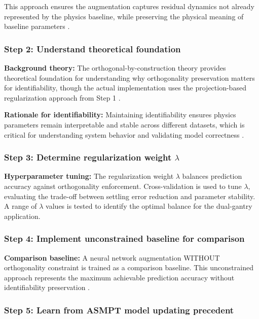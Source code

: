 This approach ensures the augmentation captures residual dynamics not already represented by the physics baseline, while preserving the physical meaning of baseline parameters \citep{gyorok2025projection, kon2022orthogonal}.

\subsubsection{Step 2: Understand theoretical foundation}

\textbf{Background theory:}
The orthogonal-by-construction theory provides theoretical foundation for understanding why orthogonality preservation matters for identifiability, though the actual implementation uses the projection-based regularization approach from Step 1 \citep{gyorok2025orthogonal}.

\textbf{Rationale for identifiability:}
Maintaining identifiability ensures physics parameters remain interpretable and stable across different datasets, which is critical for understanding system behavior and validating model correctness \citep{schoukens2019nonlinear}.

\subsubsection{Step 3: Determine regularization weight $\lambda$}

\textbf{Hyperparameter tuning:}
The regularization weight $\lambda$ balances prediction accuracy against orthogonality enforcement. Cross-validation is used to tune $\lambda$, evaluating the trade-off between settling error reduction and parameter stability. A range of $\lambda$ values is tested to identify the optimal balance for the dual-gantry application.

\subsubsection{Step 4: Implement unconstrained baseline for comparison}

\textbf{Comparison baseline:}
A neural network augmentation WITHOUT orthogonality constraint is trained as a comparison baseline. This unconstrained approach represents the maximum achievable prediction accuracy without identifiability preservation \citep{bolderman2024physics}.

\subsubsection{Step 5: Learn from ASMPT model updating precedent}

